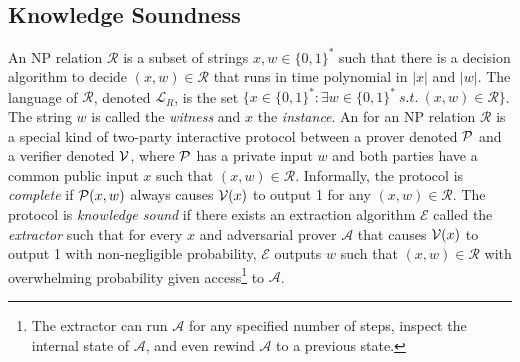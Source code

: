 \subsection{Knowledge Soundness}
An NP relation $\mathcal{R}$ is a subset of strings $x, w \in \{0,1\}^*$ such that there is a decision algorithm to decide $(x, w) \in \mathcal{R}$ that runs in time polynomial in $|x|$ and $|w|$. The language of $\mathcal{R}$, denoted $\mathcal{L}_R$, is the set $\{x \in \{0,1\}^*: \exists w \in \{0,1\}^* \ s.t. \ (x, w) \in \mathcal{R} \}$. The string $w$ is called the \emph{witness} and $x$ the \emph{instance}.
An  for an NP relation $\mathcal{R}$ is a special kind of two-party interactive protocol between a prover denoted $\mathcal{P}$ and a verifier denoted $\mathcal{V}$, where $\mathcal{P}$ has a private input $w$ and both parties have a common public input $x$ such that $(x,w) \in \mathcal{R}$. Informally, the protocol is \emph{complete} if $\mathcal{P}(x, w)$ always causes $\mathcal{V}(x)$ to output 1 for any $(x, w) \in \mathcal{R}$. The protocol is \emph{knowledge sound} if there exists an extraction algorithm $\mathcal{E}$ called the \emph{extractor} such that for every $x$ and adversarial prover $\mathcal{A}$ that causes $\mathcal{V}(x)$ to output 1 with non-negligible probability, $\mathcal{E}$ outputs $w$ such that $(x, w) \in \mathcal{R}$ with overwhelming probability given access\footnote{The extractor can run $\mathcal{A}$ for any specified number of steps, inspect the internal state of $\mathcal{A}$, and even rewind $\mathcal{A}$ to a previous state.} to $\mathcal{A}$. 


